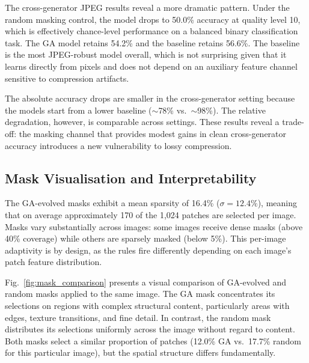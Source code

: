 \documentclass[runningheads]{llncs}
\begin{document}
The cross-generator JPEG results reveal a more dramatic pattern. Under the random masking control, the model drops to 50.0\% accuracy at quality level 10, which is effectively chance-level performance on a balanced binary classification task. The GA model retains 54.2\% and the baseline retains 56.6\%. The baseline is the most JPEG-robust model overall, which is not surprising given that it learns directly from pixels and does not depend on an auxiliary feature channel sensitive to compression artifacts.

The absolute accuracy drops are smaller in the cross-generator setting because the models start from a lower baseline ($\sim$78\% vs.\ $\sim$98\%). The relative degradation, however, is comparable across settings. These results reveal a trade-off: the masking channel that provides modest gains in clean cross-generator accuracy introduces a new vulnerability to lossy compression.

\subsection{Mask Visualisation and Interpretability}

The GA-evolved masks exhibit a mean sparsity of 16.4\% ($\sigma = 12.4\%$), meaning that on average approximately 170 of the 1{,}024 patches are selected per image. Masks vary substantially across images: some images receive dense masks (above 40\% coverage) while others are sparsely masked (below 5\%). This per-image adaptivity is by design, as the rules fire differently depending on each image's patch feature distribution.

Fig.~\ref{fig:mask_comparison} presents a visual comparison of GA-evolved and random masks applied to the same image. The GA mask concentrates its selections on regions with complex structural content, particularly areas with edges, texture transitions, and fine detail. In contrast, the random mask distributes its selections uniformly across the image without regard to content. Both masks select a similar proportion of patches (12.0\% GA vs.\ 17.7\% random for this particular image), but the spatial structure differs fundamentally.
\end{document}
